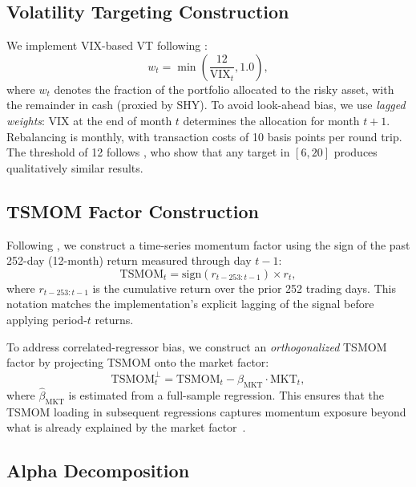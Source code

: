 \subsection{Volatility Targeting Construction}

We implement VIX-based VT following \citet{bozovic2024}:
\begin{equation}
w_t = \min\!\left(\frac{12}{\text{VIX}_t}, 1.0\right),
\label{eq:vt_weight}
\end{equation}
where $w_t$ denotes the fraction of the portfolio allocated to the risky asset, with the remainder in cash (proxied by SHY). To avoid look-ahead bias, we use \textit{lagged weights}: VIX at the end of month $t$ determines the allocation for month $t+1$. Rebalancing is monthly, with transaction costs of 10 basis points per round trip. The threshold of 12 follows \citet{lai2026a}, who show that any target in $[6, 20]$ produces qualitatively similar results.

\subsection{TSMOM Factor Construction}

Following \citet{moskowitz2012}, we construct a time-series momentum factor using the sign of the past 252-day (12-month) return measured through day $t-1$:
\begin{equation}
\text{TSMOM}_t = \text{sign}(r_{t-253:t-1}) \times r_t,
\label{eq:tsmom}
\end{equation}
where $r_{t-253:t-1}$ is the cumulative return over the prior 252 trading days. This notation matches the implementation's explicit lagging of the signal before applying period-$t$ returns.

To address correlated-regressor bias, we construct an \textit{orthogonalized} TSMOM factor by projecting TSMOM onto the market factor:
\begin{equation}
\text{TSMOM}_t^{\perp} = \text{TSMOM}_t - \hat{\beta}_{\text{MKT}} \cdot \text{MKT}_t,
\label{eq:tsmom_orth}
\end{equation}
where $\hat{\beta}_{\text{MKT}}$ is estimated from a full-sample regression. This ensures that the TSMOM loading in subsequent regressions captures momentum exposure beyond what is already explained by the market factor~\citep{hood2025}.

\subsection{Alpha Decomposition}

